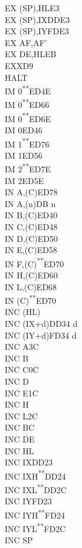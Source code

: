 \documentclass[12pt,twoside,openright,a4paper]{book}
\newcommand{\UNDOC}{\textnormal{\textsuperscript{**}}}
\begin{document}
\begin{multicols}{3}
{\begin{tabbing}
		EX (SP),HL\>E3\\
		EX (SP),IX\>DDE3\\
		EX (SP),IY\>FDE3\\
		EX AF,AF'\\
		EX DE,HL\>EB\\
		EXX\>D9\\
		HALT\\
		IM 0\UNDOC\>ED4E\\
		IM 0\UNDOC\>ED66\\
		IM 0\UNDOC\>ED6E\\
		IM 0\>ED46\\
		IM 1\UNDOC\>ED76\\
		IM 1\>ED56\\
		IM 2\UNDOC\>ED7E\\
		IM 2\>ED5E\\
		IN A,(C)\>ED78\\
		IN A,(n)\>DB n\\
		IN B,(C)\>ED40\\
		IN C,(C)\>ED48\\
		IN D,(C)\>ED50\\
		IN E,(C)\>ED58\\
		IN F,(C)\UNDOC\>ED70\\
		IN H,(C)\>ED60\\
		IN L,(C)\>ED68\\
		IN (C)\UNDOC\>ED70\\
		INC (HL)\\
		INC (IX+d)\>DD34 d\\
		INC (IY+d)\>FD34 d\\
		INC A\>3C\\
		INC B\\
		INC C\>0C\\
		INC D\\
		INC E\>1C\\
		INC H\\
		INC L\>2C\\
		INC BC\\
		INC DE\\
		INC HL\\
		INC IX\>DD23\\
		INC IXH\UNDOC\>DD24\\
		INC IXL\UNDOC\>DD2C\\
		INC IY\>FD23\\
		INC IYH\UNDOC\>FD24\\
		INC IYL\UNDOC\>FD2C\\
		INC SP\\

\end{tabbing}}
\end{multicols}
\end{document}
